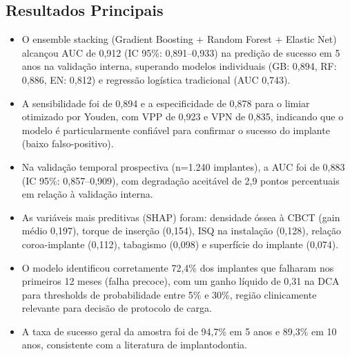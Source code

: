 \subsection{Resultados Principais}
\begin{itemize}
  \item O ensemble stacking (Gradient Boosting + Random Forest + Elastic
        Net) alcançou AUC de 0,912 (IC 95\%: 0,891--0,933) na predição
        de sucesso em 5 anos na validação interna, superando modelos
        individuais (GB: 0,894, RF: 0,886, EN: 0,812) e regressão
        logística tradicional (AUC 0,743).
  \item A sensibilidade foi de 0,894 e a especificidade de 0,878 para
        o limiar otimizado por Youden, com VPP de 0,923 e VPN de 0,835,
        indicando que o modelo é particularmente confiável para
        confirmar o sucesso do implante (baixo falso-positivo).
  \item Na validação temporal prospectiva (n=1.240 implantes), a AUC foi
        de 0,883 (IC 95\%: 0,857--0,909), com degradação aceitável de
        2,9 pontos percentuais em relação à validação interna.
  \item As variáveis mais preditivas (SHAP) foram: densidade óssea à
        CBCT (gain médio 0,197), torque de inserção (0,154), ISQ na
        instalação (0,128), relação coroa-implante (0,112), tabagismo
        (0,098) e superfície do implante (0,074).
  \item O modelo identificou corretamente 72,4\% dos implantes que
        falharam nos primeiros 12 meses (falha precoce), com um ganho
        líquido de 0,31 na DCA para thresholds de probabilidade entre
        5\% e 30\%, região clinicamente relevante para decisão de
        protocolo de carga.
  \item A taxa de sucesso geral da amostra foi de 94,7\% em 5 anos e
        89,3\% em 10 anos, consistente com a literatura de
        implantodontia.
\end{itemize}

